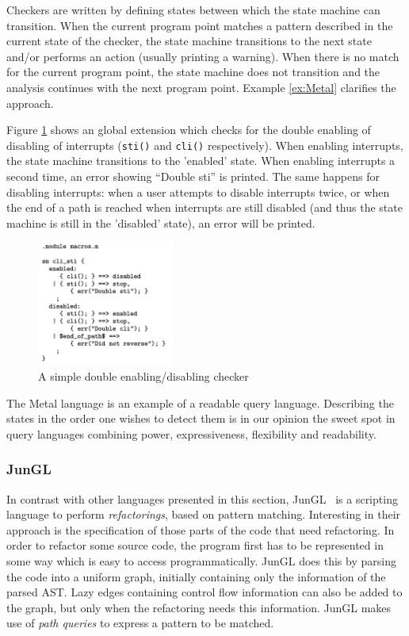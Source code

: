 Checkers are written by defining states between which the state machine can transition. When the current program point matches a pattern described in the current state of the checker, the state machine transitions to the next state and/or performs an action (usually printing a warning). When there is no match for the current program point, the state machine does not transition and the analysis continues with the next program point. Example \ref{ex:Metal} clarifies the approach. 
\begin{exmp}
\label{ex:Metal}
Figure \ref{fig:Metal} shows an global extension which checks for the double enabling of disabling of interrupts (\texttt{sti()} and \texttt{cli()} respectively). When enabling interrupts, the state machine transitions to the 'enabled' state. When enabling interrupts a second time, an error showing ``Double sti'' is printed. The same happens for disabling interrupts: when a user attempts to disable interrupts twice, or when the end of a path is reached when interrupts are still disabled (and thus the state machine is still in the 'disabled' state), an error will be printed.

\begin{figure}[h]
    \centering
      \includegraphics[width=0.4\textwidth]{images/Metal} 
      \caption{A simple double enabling/disabling checker}
    \label{fig:Metal}
\end{figure}

\end{exmp}

The Metal language is an example of a readable query language. Describing the states in the order one wishes to detect them is in our opinion the sweet spot in query languages combining power, expressiveness, flexibility and readability.

\subsubsection*{JunGL}

In contrast with other languages presented in this section, JunGL~\cite{JunGL} is a scripting language to perform \textit{refactorings}, based on pattern matching. Interesting in their approach is the specification of those parts of the code that need refactoring. In order to refactor some source code, the program first has to be represented in some way which is easy to access programmatically. JunGL does this by parsing the code into a uniform graph, initially containing only the information of the parsed AST. Lazy edges containing control flow information can also be added to the graph, but only when the refactoring needs this information. JunGL makes use of \textit{path queries} to express a pattern to be matched. 

